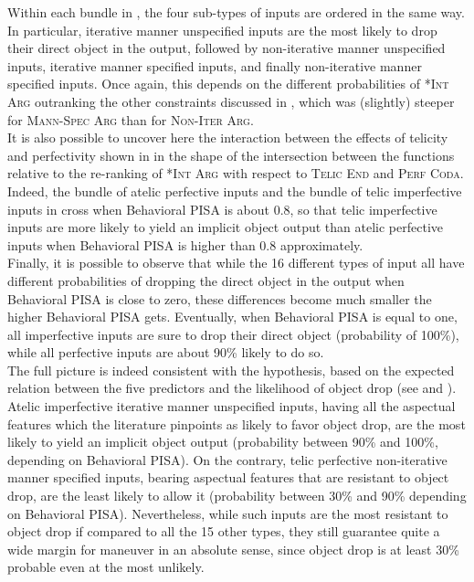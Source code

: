Within each bundle in , the four sub-types of inputs are ordered in the same way. In particular, iterative manner unspecified inputs are the most likely to drop their direct object in the output, followed by non-iterative manner unspecified inputs, iterative manner specified inputs, and finally non-iterative manner specified inputs. Once again, this depends on the different probabilities of \textsc{*Int Arg} outranking the other constraints discussed in , which was (slightly) steeper for \textsc{Mann-Spec Arg} than for \textsc{Non-Iter Arg}.\\
It is also possible to uncover here the interaction between the effects of telicity and perfectivity shown in  in the shape of the intersection between the functions relative to the re-ranking of \textsc{*Int Arg} with respect to \textsc{Telic End} and \textsc{Perf Coda}. Indeed, the bundle of atelic perfective inputs and the bundle of telic imperfective inputs in  cross when Behavioral PISA is about 0.8, so that telic imperfective inputs are more likely to yield an implicit object output than atelic perfective inputs when Behavioral PISA is higher than 0.8 approximately.\\
Finally, it is possible to observe that while the 16 different types of input all have different probabilities of dropping the direct object in the output when Behavioral PISA is close to zero, these differences become much smaller the higher Behavioral PISA gets. Eventually, when Behavioral PISA is equal to one, all imperfective inputs are sure to drop their direct object (probability of 100\%), while all perfective inputs are about 90\% likely to do so.\\
The full picture is indeed consistent with the hypothesis, based on the expected relation between the five predictors and the likelihood of object drop (see  and ). Atelic imperfective iterative manner unspecified inputs, having all the aspectual features which the literature pinpoints as likely to favor object drop, are the most likely to yield an implicit object output (probability between 90\% and 100\%, depending on Behavioral PISA). On the contrary, telic perfective non-iterative manner specified inputs, bearing aspectual features that are resistant to object drop, are the least likely to allow it (probability between 30\% and 90\% depending on Behavioral PISA). Nevertheless, while such inputs are the most resistant to object drop if compared to all the 15 other types, they still guarantee quite a wide margin for maneuver in an absolute sense, since object drop is at least 30\% probable even at the most unlikely.


